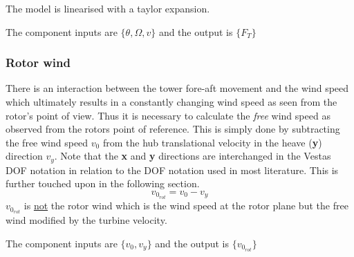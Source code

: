 The model is linearised with a taylor expansion.

The component inputs are $ \{\theta, \Omega, v \} $ and the output is $ \{F_T\} $


\subsubsection{Rotor wind} \label{sec:comp_rot_wind}
There is an interaction between the tower fore-aft movement and the wind speed which ultimately results in a constantly changing wind speed as seen from the rotor's point of view. Thus it is necessary to calculate the \textit{free} wind speed as observed from the rotors point of reference. This is simply done by subtracting the free wind speed $ v_0 $ from the hub translational velocity in the heave (\textbf{y}) direction $ v_y $. Note that the \textbf{x} and \textbf{y} directions are interchanged in the Vestas DOF notation in relation to the DOF notation used in most literature. This is further touched upon in the following section. 
\begin{equation}\label{eq:comp_rotorwind}
	v_{0_{rot}} = v_{0} - v_y
\end{equation}
$ v_{0_{rot}} $ is \underline{not} the rotor wind which is the wind speed at the rotor plane but the free wind modified by the turbine velocity.

The component inputs are $ \{v_0, v_y\} $ and the output is $ \{v_{0_{rot}}\} $


